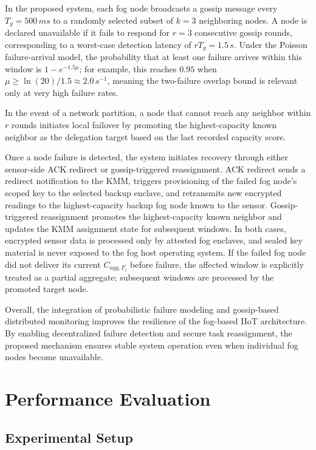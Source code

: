 \documentclass[conference]{IEEEtran}
\begin{document}
    In the proposed system, each fog node broadcasts a gossip message every $T_g = 500\,ms$ to a randomly selected subset of $k = 3$ neighboring nodes. A node is declared unavailable if it fails to respond for $r = 3$ consecutive gossip rounds, corresponding to a worst-case detection latency of $rT_g = 1.5\,s$. Under the Poisson failure-arrival model, the probability that at least one failure arrives within this window is $1-e^{-1.5\mu}$; for example, this reaches $0.95$ when $\mu \geq \ln(20)/1.5 \approx 2.0\,s^{-1}$, meaning the two-failure overlap bound is relevant only at very high failure rates.

    In the event of a network partition, a node that cannot reach any neighbor within $r$ rounds initiates local failover by promoting the highest-capacity known neighbor as the delegation target based on the last recorded capacity score.

    Once a node failure is detected, the system initiates recovery through either sensor-side ACK redirect or gossip-triggered reassignment. ACK redirect sends a redirect notification to the KMM, triggers provisioning of the failed fog node's scoped key to the selected backup enclave, and retransmits new encrypted readings to the highest-capacity backup fog node known to the sensor. Gossip-triggered reassignment promotes the highest-capacity known neighbor and updates the KMM assignment state for subsequent windows. In both cases, encrypted sensor data is processed only by attested fog enclaves, and sealed key material is never exposed to the fog host operating system. If the failed fog node did not deliver its current $C_{agg,F_i}$ before failure, the affected window is explicitly treated as a partial aggregate; subsequent windows are processed by the promoted target node.

    Overall, the integration of probabilistic failure modeling and gossip-based distributed monitoring improves the resilience of the fog-based IIoT architecture. By enabling decentralized failure detection and secure task reassignment, the proposed mechanism ensures stable system operation even when individual fog nodes become unavailable.

    \section{Performance Evaluation}
    \label{sec:evaluation}

    \subsection{Experimental Setup}
    \label{sec:eval-setup}
\end{document}
